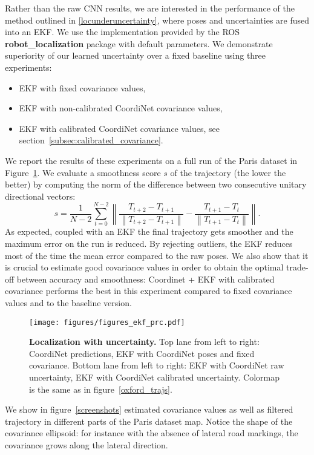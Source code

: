 \documentclass[10pt,twocolumn,letterpaper]{article}
\newcommand{\norm}[1]{\left\lVert#1\right\rVert}
\begin{document}
Rather than the raw CNN results, we are interested in the performance of the method outlined in \ref{locunderuncertainty}, where poses and uncertainties are fused into an EKF. We use the implementation provided by the ROS \textbf{robot\_localization} package with default parameters. We demonstrate superiority of our learned uncertainty over a fixed baseline using three experiments:
\begin{itemize}
    \item EKF with fixed covariance values,
    \item EKF with non-calibrated CoordiNet covariance values,
    \item EKF with calibrated CoordiNet covariance values, see section~\ref{subsec:calibrated_covariance}.
\end{itemize}
We report the results of these experiments on a full run of the Paris dataset in Figure~\ref{uncertainty_effect}. We evaluate a smoothness score $s$ of the trajectory (the lower the better) by computing the norm of the difference between two consecutive unitary directional vectors:
$$s = \frac{1}{N-2}\sum_{t=0}^{N-2} \norm{ \frac{T_{t+2} - T_{t+1}}{\norm{T_{t+2} - T_{t+1}}} - \frac{T_{t+1} - T_{t}}{\norm{T_{t+1} - T_{t}}}}.$$ 
As expected, coupled with an EKF the final trajectory gets smoother and the maximum error on the run is reduced. By rejecting outliers, the EKF reduces most of the time the mean error compared to the raw poses. We also show that it is crucial to estimate good covariance values in order to obtain the optimal trade-off between accuracy and smoothness: Coordinet + EKF with calibrated covariance performs the best in this experiment compared to fixed covariance values and to the baseline version.


\begin{figure}[!t]
   \centering
   \texttt{[image: figures/figures\_ekf\_prc.pdf]}
   \caption{\textbf{Localization with uncertainty.} Top lane from left to right: CoordiNet predictions, EKF with CoordiNet poses and fixed covariance. Bottom lane from left to right: EKF with CoordiNet raw uncertainty, EKF with CoordiNet calibrated uncertainty. Colormap is the same as in figure~\ref{oxford_trajs}.}\label{uncertainty_effect}
\end{figure}

We show in figure~\ref{screenshots} estimated covariance values as well as filtered trajectory in different parts of the Paris dataset map. Notice the shape of the covariance ellipsoid: for instance with the absence of lateral road markings, the covariance grows along the lateral direction.
\end{document}
